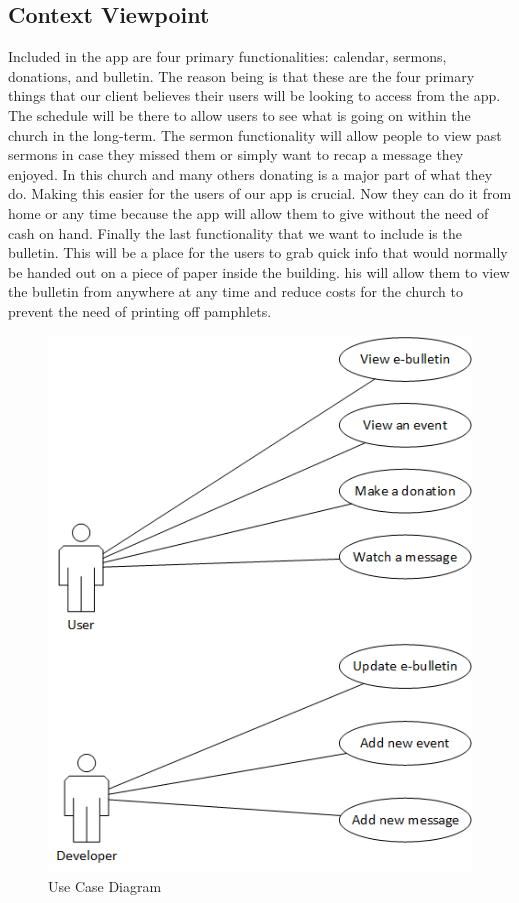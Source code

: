 \documentclass[letterpaper,10pt,draftclsnofoot,onecolumn,titlepage]{IEEEtran}
\begin{document}
		\subsection{Context Viewpoint}
		Included in the app are four primary functionalities: calendar, sermons, donations, and bulletin.
		The reason being is that these are the four primary things that our client believes their users will be looking to access from the app.
		The schedule will be there to allow users to see what is going on within the church in the long-term.
		The sermon functionality will allow people to view past sermons in case they missed them or simply want to recap a message they enjoyed.
		In this church and many others donating is a major part of what they do.
		Making this easier for the users of our app is crucial.
		Now they can do it from home or any time because the app will allow them to give without the need of cash on hand.
		Finally the last functionality that we want to include is the bulletin.
		This will be a place for the users to grab quick info that would normally be handed out on a piece of paper inside the building.
		his will allow them to view the bulletin from anywhere at any time and reduce costs for the church to prevent the need of printing off pamphlets.

		\begin{figure}[H]
			\centering
			\includegraphics[natwidth=462, natheight=585]{UseCase.png}
			\caption{Use Case Diagram}
			\label{fig:usecase}
		\end{figure}
\end{document}
